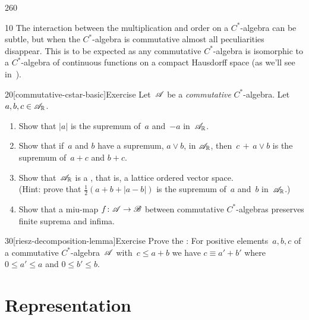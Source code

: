 \begin{parsec}{260}%
\begin{point}{10}%
The interaction between the multiplication and order
on a $C^*$-algebra can be subtle,
but
when the $C^*$-algebra is commutative
almost all peculiarities disappear.
This is to be expected
as any commutative $C^*$-algebra
is isomorphic to a $C^*$-algebra
of continuous functions on a compact Hausdorff space
(as we'll see in~).
\end{point}
\begin{point}{20}[commutative-cstar-basic]{Exercise}%
Let~$\mathscr{A}$ be a \emph{commutative} $C^*$-algebra.
Let~$a,b,c\in\mathscr{A}_{\mathbb{R}}$.
\begin{enumerate}
\item
Show that $\left| a\right|$ is the supremum of~$a$ and~$-a$
in~$\mathscr{A}_{\mathbb{R}}$.
\item
Show that if~$a$ and $b$ have a supremum, $a\vee b$, in $\mathscr{A}_{\mathbb{R}}$,
then~$c\,+\,a\vee b$ is the supremum of~$a+c$ and $b+c$.
\item
Show that~$\mathscr{A}_{\mathbb{R}}$ is a ,
that is,  a lattice ordered vector space.\\
(Hint: prove that $\frac{1}{2}(a+b+\left|a-b\right|)$
is the supremum of~$a$ and~$b$ in~$\mathscr{A}_{\mathbb{R}}$.)
\item
Show that a miu-map $f\colon \mathscr{A}\to\mathscr{B}$
between commutative $C^*$-algebras
preserves finite suprema and infima.
\end{enumerate}
\end{point}
\begin{point}{30}[riesz-decomposition-lemma]{Exercise}%
Prove the :%
For positive elements~$a,b,c$ of a commutative $C^*$-algebra~$\mathscr{A}$
with~$c\leq a+b$
we have $c\equiv a'+b'$
where  $0\leq a'\leq a$ and $0\leq b'\leq b$.
\end{point}
\end{parsec}
\section{Representation}
